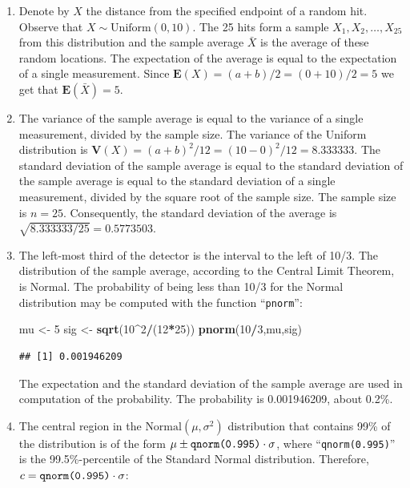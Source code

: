 \documentclass[
]{krantz}
\makeatletter
\newenvironment{Shaded}{\begin{snugshade}}{\end{snugshade}}
\newcommand{\DecValTok}[1]{\textcolor[rgb]{0.00,0.00,0.81}{#1}}
\newcommand{\KeywordTok}[1]{\textcolor[rgb]{0.13,0.29,0.53}{\textbf{#1}}}
\newcommand{\NormalTok}[1]{#1}
\newcommand{\OperatorTok}[1]{\textcolor[rgb]{0.81,0.36,0.00}{\textbf{#1}}}
\newcommand{\StringTok}[1]{\textcolor[rgb]{0.31,0.60,0.02}{#1}}
\newcommand{\Expec}{\mathbf{E}}
\newcommand{\Var}{\mathbf{V}}
\newenvironment{kframe}{%
\medskip{}
\setlength{\fboxsep}{.8em}
 \def\at@end@of@kframe{}%
 \ifinner\ifhmode%
  \def\at@end@of@kframe{\end{minipage}}%
  \begin{minipage}{\columnwidth}%
 \fi\fi%
 \def\FrameCommand##1{\hskip\@totalleftmargin \hskip-\fboxsep
 \colorbox{shadecolor}{##1}\hskip-\fboxsep
     \hskip-\linewidth \hskip-\@totalleftmargin \hskip\columnwidth}%
 \MakeFramed {\advance\hsize-\width
   \@totalleftmargin\z@ \linewidth\hsize
   \@setminipage}}%
 {\par\unskip\endMakeFramed%
 \at@end@of@kframe}
\renewenvironment{Shaded}{\begin{kframe}}{\end{kframe}}
\theoremstyle{definition}
\theoremstyle{definition}
\theoremstyle{definition}
\theoremstyle{remark}
\makeatother
\begin{document}
\begin{enumerate}
\def\labelenumi{\arabic{enumi}.}
\item
  Denote by \(X\) the distance from the
  specified endpoint of a random hit. Observe that
  \(X \sim \mbox{Uniform}(0,10)\). The 25 hits form a sample
  \(X_1, X_2, \ldots, X_{25}\) from this distribution and the sample average
  \(\bar X\) is the average of these random locations. The expectation of
  the average is equal to the expectation of a single measurement. Since
  \(\Expec(X) = (a + b)/2 = (0 + 10)/2 = 5\) we get that
  \(\Expec(\bar X) = 5\).
\item
  The variance of the sample average
  is equal to the variance of a single measurement, divided by the sample
  size. The variance of the Uniform distribution is
  \(\Var(X) = (a + b)^2/12 = (10-0)^2/12 = 8.333333\). The standard
  deviation of the sample average is equal to the standard deviation of
  the sample average is equal to the standard deviation of a single
  measurement, divided by the square root of the sample size. The sample
  size is \(n=25\). Consequently, the standard deviation of the average is
  \(\sqrt{8.333333/25}=0.5773503\).
\item
  The left-most third of the detector
  is the interval to the left of 10/3. The distribution of the sample
  average, according to the Central Limit Theorem, is Normal. The
  probability of being less than 10/3 for the Normal distribution may be
  computed with the function ``\texttt{pnorm}'':

\begin{Shaded}
\begin{Highlighting}[]
\NormalTok{mu <-}\StringTok{ }\DecValTok{5}
\NormalTok{sig <-}\StringTok{ }\KeywordTok{sqrt}\NormalTok{(}\DecValTok{10}\OperatorTok{^}\DecValTok{2}\OperatorTok{/}\NormalTok{(}\DecValTok{12}\OperatorTok{*}\DecValTok{25}\NormalTok{))}
\KeywordTok{pnorm}\NormalTok{(}\DecValTok{10}\OperatorTok{/}\DecValTok{3}\NormalTok{,mu,sig)}
\end{Highlighting}
\end{Shaded}

\begin{verbatim}
## [1] 0.001946209
\end{verbatim}

  The expectation and the standard deviation of the sample average are
  used in computation of the probability. The probability is 0.001946209,
  about 0.2\%.
\item
  The central region in the
  \(\mbox{Normal}(\mu,\sigma^2)\) distribution that contains 99\% of the
  distribution is of the form
  \(\mu \pm \mbox{\texttt{qnorm(0.995)}}\cdot \sigma\), where
  ``\texttt{qnorm(0.995)}'' is the 99.5\%-percentile of the Standard Normal
  distribution. Therefore, \(c =\mbox{\texttt{qnorm(0.995)}}\cdot \sigma\):


\end{enumerate}
\end{document}
